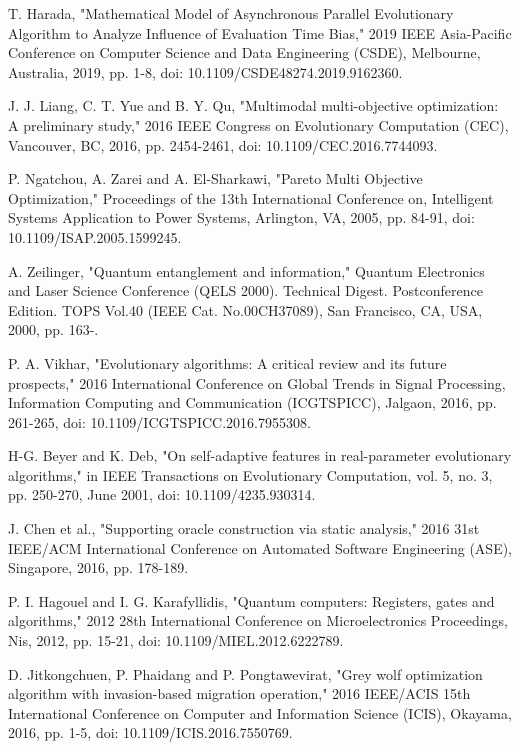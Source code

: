 \documentclass[conference]{IEEEtran}
\begin{document}
\begin{thebibliography}{00}

T. Harada, "Mathematical Model of Asynchronous Parallel Evolutionary Algorithm to Analyze Influence of Evaluation Time Bias," 2019 IEEE Asia-Pacific Conference on Computer Science and Data Engineering (CSDE), Melbourne, Australia, 2019, pp. 1-8, doi: 10.1109/CSDE48274.2019.9162360.

 J. J. Liang, C. T. Yue and B. Y. Qu, "Multimodal multi-objective optimization: A preliminary study," 2016 IEEE Congress on Evolutionary Computation (CEC), Vancouver, BC, 2016, pp. 2454-2461, doi: 10.1109/CEC.2016.7744093.

 P. Ngatchou, A. Zarei and A. El-Sharkawi, "Pareto Multi Objective Optimization," Proceedings of the 13th International Conference on, Intelligent Systems Application to Power Systems, Arlington, VA, 2005, pp. 84-91, doi: 10.1109/ISAP.2005.1599245.

 A. Zeilinger, "Quantum entanglement and information," Quantum Electronics and Laser Science Conference (QELS 2000). Technical Digest. Postconference Edition. TOPS Vol.40 (IEEE Cat. No.00CH37089), San Francisco, CA, USA, 2000, pp. 163-.

 P. A. Vikhar, "Evolutionary algorithms: A critical review and its future prospects," 2016 International Conference on Global Trends in Signal Processing, Information Computing and Communication (ICGTSPICC), Jalgaon, 2016, pp. 261-265, doi: 10.1109/ICGTSPICC.2016.7955308.

 H-G. Beyer and K. Deb, "On self-adaptive features in real-parameter evolutionary algorithms," in IEEE Transactions on Evolutionary Computation, vol. 5, no. 3, pp. 250-270, June 2001, doi: 10.1109/4235.930314.


 J. Chen et al., "Supporting oracle construction via static analysis," 2016 31st IEEE/ACM International Conference on Automated Software Engineering (ASE), Singapore, 2016, pp. 178-189.

 P. I. Hagouel and I. G. Karafyllidis, "Quantum computers: Registers, gates and algorithms," 2012 28th International Conference on Microelectronics Proceedings, Nis, 2012, pp. 15-21, doi: 10.1109/MIEL.2012.6222789.

 D. Jitkongchuen, P. Phaidang and P. Pongtawevirat, "Grey wolf optimization algorithm with invasion-based migration operation," 2016 IEEE/ACIS 15th International Conference on Computer and Information Science (ICIS), Okayama, 2016, pp. 1-5, doi: 10.1109/ICIS.2016.7550769.


\end{thebibliography}
\end{document}
